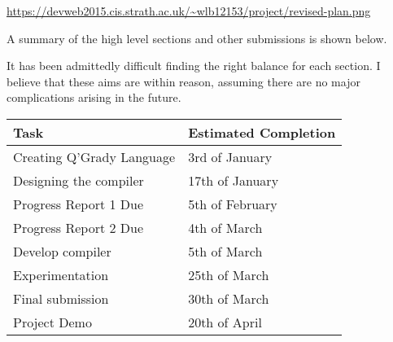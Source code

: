 \documentclass[11pt, a4paper]{article}
\begin{document}
\url{https://devweb2015.cis.strath.ac.uk/~wlb12153/project/revised-plan.png}

A summary of the high level sections and other submissions is shown below.

It has been admittedly difficult finding the right balance for each section. I
believe that these aims are within reason, assuming there are no major
complications arising in the future.
\begin{center}
    \begin{tabular}{l | p{7.5cm}}
        Task & Estimated Completion\\
        \hline
        Creating Q'Grady Language & 3rd of January \\

        Designing the compiler & 17th of January \\

        Progress Report 1 Due & 5th of February \\

        Progress Report 2 Due & 4th of March \\

        Develop compiler & 5th of March \\

        Experimentation & 25th of March \\

        Final submission & 30th of March \\

        Project Demo & 20th of April
\end{tabular}
\end{center}
\end{document}
